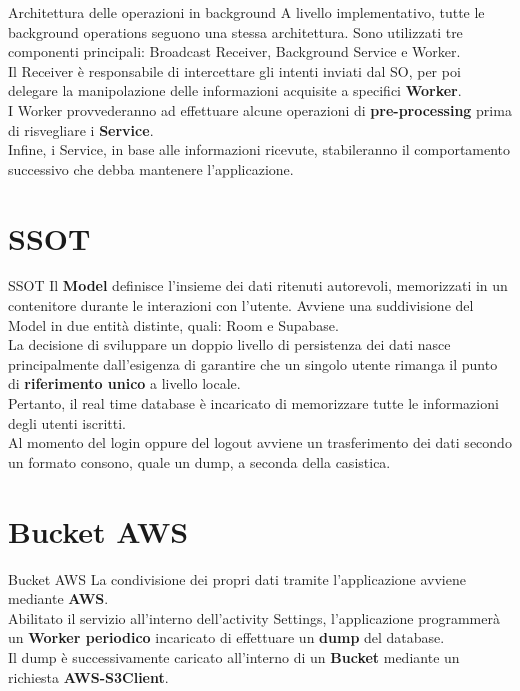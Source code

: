 \documentclass[10pt]{beamer}
\begin{document}
\begin{frame}{Architettura delle operazioni in background}
    \small A livello implementativo, tutte le background operations seguono una stessa architettura. Sono utilizzati tre componenti principali: Broadcast Receiver, Background Service e Worker. \vspace*{7pt}\\ Il Receiver è responsabile di intercettare gli intenti inviati dal SO, per poi delegare la manipolazione delle informazioni acquisite a specifici \textbf{Worker}. \vspace*{7pt}\\ I Worker provvederanno ad effettuare alcune operazioni di \textbf{pre-processing} prima di risvegliare i \textbf{Service}. \vspace*{7pt}\\ Infine, i Service, in base alle informazioni ricevute, stabileranno il comportamento successivo che debba mantenere l'applicazione.
\end{frame}

\section{SSOT}
\begin{frame}{SSOT}
    \small Il \textbf{Model} definisce l'insieme dei dati ritenuti autorevoli, memorizzati in un contenitore durante le interazioni con l'utente. Avviene una suddivisione del Model in due entità distinte, quali: Room e Supabase. \vspace*{7pt}\\ La decisione di sviluppare un doppio livello di persistenza dei dati nasce principalmente dall'esigenza di garantire che un singolo utente rimanga il punto di \textbf{riferimento unico} a livello locale. \vspace*{7pt}\\ Pertanto, il real time database è incaricato di memorizzare tutte le informazioni degli utenti iscritti. \vspace{7pt}\\ Al momento del login oppure del logout avviene un trasferimento dei dati secondo un formato consono, quale un dump, a seconda della casistica.
\end{frame}

\section{Bucket AWS}
\begin{frame}{Bucket AWS}
    \small La condivisione dei propri dati tramite l'applicazione avviene mediante \textbf{AWS}. \vspace*{7pt}\\ Abilitato il servizio all'interno dell'activity Settings, l'applicazione programmerà un \textbf{Worker periodico} incaricato di effettuare un \textbf{dump} del database. \vspace*{7pt}\\ Il dump è successivamente caricato all'interno di un \textbf{Bucket} mediante un richiesta \textbf{AWS-S3Client}.
\end{frame}
\end{document}
